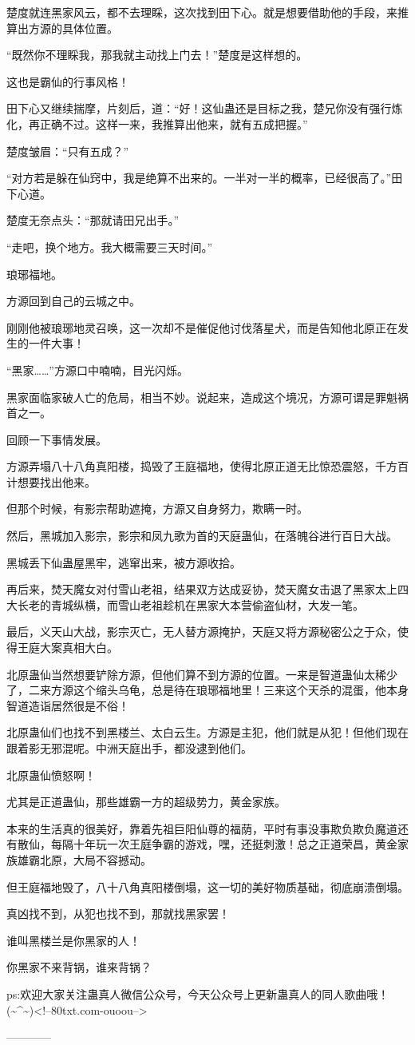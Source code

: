 \begin{this_body}
楚度就连黑家风云，都不去理睬，这次找到田下心。就是想要借助他的手段，来推算出方源的具体位置。

“既然你不理睬我，那我就主动找上门去！”楚度是这样想的。

这也是霸仙的行事风格！

田下心又继续揣摩，片刻后，道：“好！这仙蛊还是目标之我，楚兄你没有强行炼化，再正确不过。这样一来，我推算出他来，就有五成把握。”

楚度皱眉：“只有五成？”

“对方若是躲在仙窍中，我是绝算不出来的。一半对一半的概率，已经很高了。”田下心道。

楚度无奈点头：“那就请田兄出手。”

“走吧，换个地方。我大概需要三天时间。”

琅琊福地。

方源回到自己的云城之中。

刚刚他被琅琊地灵召唤，这一次却不是催促他讨伐落星犬，而是告知他北原正在发生的一件大事！

“黑家……”方源口中喃喃，目光闪烁。

黑家面临家破人亡的危局，相当不妙。说起来，造成这个境况，方源可谓是罪魁祸首之一。

回顾一下事情发展。

方源弄塌八十八角真阳楼，捣毁了王庭福地，使得北原正道无比惊恐震怒，千方百计想要找出他来。

但那个时候，有影宗帮助遮掩，方源又自身努力，欺瞒一时。

然后，黑城加入影宗，影宗和凤九歌为首的天庭蛊仙，在落魄谷进行百日大战。

黑城丢下仙蛊屋黑牢，逃窜出来，被方源收拾。

再后来，焚天魔女对付雪山老祖，结果双方达成妥协，焚天魔女击退了黑家太上四大长老的青城纵横，而雪山老祖趁机在黑家大本营偷盗仙材，大发一笔。

最后，义天山大战，影宗灭亡，无人替方源掩护，天庭又将方源秘密公之于众，使得王庭大案真相大白。

北原蛊仙当然想要铲除方源，但他们算不到方源的位置。一来是智道蛊仙太稀少了，二来方源这个缩头乌龟，总是待在琅琊福地里！三来这个天杀的混蛋，他本身智道造诣居然很是不俗！

北原蛊仙们也找不到黑楼兰、太白云生。方源是主犯，他们就是从犯！但他们现在跟着影无邪混呢。中洲天庭出手，都没逮到他们。

北原蛊仙愤怒啊！

尤其是正道蛊仙，那些雄霸一方的超级势力，黄金家族。

本来的生活真的很美好，靠着先祖巨阳仙尊的福荫，平时有事没事欺负欺负魔道还有散仙，每隔十年玩一次王庭争霸的游戏，嘿，还挺刺激！总之正道荣昌，黄金家族雄霸北原，大局不容撼动。

但王庭福地毁了，八十八角真阳楼倒塌，这一切的美好物质基础，彻底崩溃倒塌。

真凶找不到，从犯也找不到，那就找黑家罢！

谁叫黑楼兰是你黑家的人！

你黑家不来背锅，谁来背锅？

ps:欢迎大家关注蛊真人微信公众号，今天公众号上更新蛊真人的同人歌曲哦！(\~{}\^{}\~{})<!--80txt.com-ouoou-->

------------

\end{this_body}


